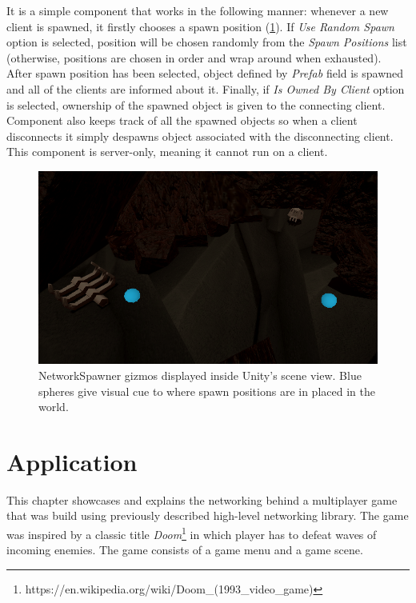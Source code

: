 \documentclass[times, utf8, diplomski]{fer}
\begin{document}
It is a simple component that works in the following manner: whenever a new client is spawned, it firstly chooses a spawn position (\ref{table:network-spawner-gizmos}). If \textit{Use Random Spawn} option is selected, position will be chosen randomly from the \textit{Spawn Positions} list (otherwise, positions are chosen in order and wrap around when exhausted). \\

After spawn position has been selected, object defined by \textit{Prefab} field is spawned and all of the clients are informed about it. Finally, if \textit{Is Owned By Client} option is selected, ownership of the spawned object is given to the connecting client. \\

Component also keeps track of all the spawned objects so when a client disconnects it simply despawns object associated with the disconnecting client. This component is server-only, meaning it cannot run on a client.

\begin{figure}[H]
	\centering
	\includegraphics[scale=0.65]{NetworkSpawner-example}
	\caption{NetworkSpawner gizmos displayed inside Unity's scene view. Blue spheres give visual cue to where spawn positions are in placed in the world.}
	\label{table:network-spawner-gizmos}
\end{figure}

\chapter{Application}
This chapter showcases and explains the networking behind a multiplayer game that was build using previously described high-level networking library. The game was inspired by a classic title \textit{Doom}\footnote{https://en.wikipedia.org/wiki/Doom\_(1993\_video\_game)} in which player has to defeat waves of incoming enemies. The game consists of a game menu and a game scene.
\end{document}

